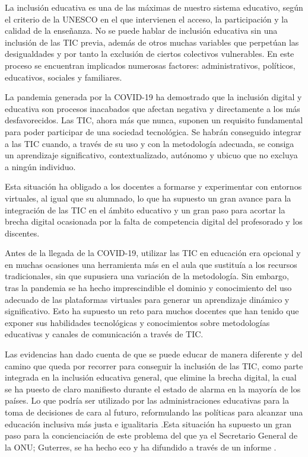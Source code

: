 \documentclass[spanish]{textolivre}
\begin{document}
La inclusión educativa es una de las máximas de nuestro sistema educativo, según el criterio de la UNESCO en el que intervienen el acceso, la participación y la calidad de la enseñanza. No se puede hablar de inclusión educativa sin una inclusión de las TIC previa, además de otros muchas variables que perpetúan las desigualdades y por tanto la exclusión de ciertos colectivos vulnerables. En este proceso se encuentran implicados numerosas factores: administrativos, políticos, educativos, sociales y familiares.

La pandemia generada por la COVID-19 ha demostrado que la inclusión digital y educativa son procesos inacabados que afectan negativa y directamente a los más desfavorecidos. Las TIC, ahora más que nunca, suponen un requisito fundamental para poder participar de una sociedad tecnológica. Se habrán conseguido integrar a las TIC cuando, a través de su uso y con la metodología adecuada, se consiga un aprendizaje significativo, contextualizado, autónomo y ubicuo que no excluya a ningún individuo.

Esta situación ha obligado a los docentes a formarse y experimentar con entornos virtuales, al igual que su alumnado, lo que ha supuesto un gran avance para la integración de las TIC en el ámbito educativo y un gran paso para acortar la brecha digital ocasionada por la falta de competencia digital del profesorado y los discentes.

Antes de la llegada de la COVID-19, utilizar las TIC en educación era opcional y en muchas ocasiones una herramienta más en el aula que sustituía a los recursos tradicionales, sin que supusiera una variación de la metodología. Sin embargo, tras la pandemia se ha hecho imprescindible el dominio y conocimiento del uso adecuado de las plataformas virtuales para generar un aprendizaje dinámico y significativo. Esto ha supuesto un reto para muchos docentes que han tenido que exponer sus habilidades tecnológicas y conocimientos sobre metodologías educativas y canales de comunicación a través de TIC.

Las evidencias han dado cuenta de que se puede educar de manera diferente y del camino que queda por recorrer para conseguir la inclusión de las TIC, como parte integrada en la inclusión educativa general, que elimine la brecha digital, la cual se ha puesto de claro manifiesto durante el estado de alarma en la mayoría de los países. Lo que podría ser utilizado por las administraciones educativas para la toma de decisiones de cara al futuro, reformulando las políticas para alcanzar una educación inclusiva más justa e igualitaria \cite{alvarez-gardyn2020}.Esta situación ha supuesto un gran paso para la concienciación de este problema del que ya el Secretario General de la ONU; Guterres, se ha hecho eco y ha difundido a través de un informe \cite{onu2020}.
\end{document}
